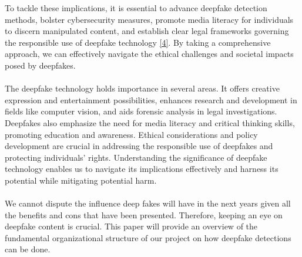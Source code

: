 To tackle these implications, it is essential to advance deepfake detection methods, bolster cybersecurity measures, promote media literacy for individuals to discern manipulated content, and establish clear legal frameworks governing the responsible use of deepfake technology \hyperref[ref4]{[4]}. By taking a comprehensive approach, we can effectively navigate the ethical challenges and societal impacts posed by deepfakes.
\\\\
The deepfake technology holds importance in several areas. It offers creative expression and entertainment possibilities, enhances research and development in fields like computer vision, and aids forensic analysis in legal investigations. Deepfakes also emphasize the need for media literacy and critical thinking skills, promoting education and awareness. Ethical considerations and policy development are crucial in addressing the responsible use of deepfakes and protecting individuals' rights. Understanding the significance of deepfake technology enables us to navigate its implications effectively and harness its potential while mitigating potential harm.
\\\\
We cannot dispute the influence deep fakes will have in the next years given all the benefits and cons that have been presented. Therefore, keeping an eye on deepfake content is crucial. This paper will provide an overview of the fundamental organizational structure of our project on how deepfake detections can be done.